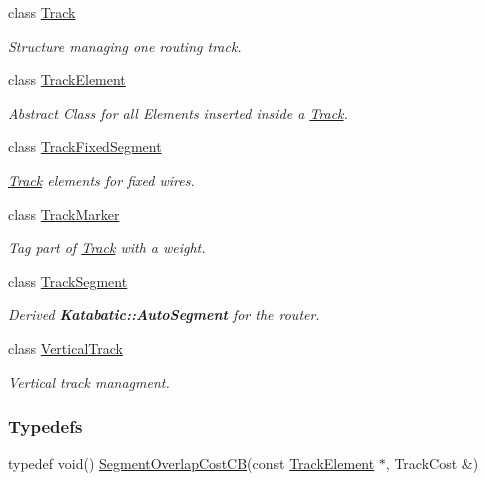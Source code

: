 \begin{DoxyCompactItemize}
class \hyperlink{classKite_1_1Track}{Track}
\begin{DoxyCompactList}\small\item\em Structure managing one routing track. \end{DoxyCompactList}\item 
class \hyperlink{classKite_1_1TrackElement}{Track\+Element}
\begin{DoxyCompactList}\small\item\em Abstract Class for all Elements inserted inside a \hyperlink{classKite_1_1Track}{Track}. \end{DoxyCompactList}\item 
class \hyperlink{classKite_1_1TrackFixedSegment}{Track\+Fixed\+Segment}
\begin{DoxyCompactList}\small\item\em \hyperlink{classKite_1_1Track}{Track} elements for fixed wires. \end{DoxyCompactList}\item 
class \hyperlink{classKite_1_1TrackMarker}{Track\+Marker}
\begin{DoxyCompactList}\small\item\em Tag part of \hyperlink{classKite_1_1Track}{Track} with a weight. \end{DoxyCompactList}\item 
class \hyperlink{classKite_1_1TrackSegment}{Track\+Segment}
\begin{DoxyCompactList}\small\item\em Derived \textbf{ Katabatic\+::\+Auto\+Segment} for the router. \end{DoxyCompactList}\item 
class \hyperlink{classKite_1_1VerticalTrack}{Vertical\+Track}
\begin{DoxyCompactList}\small\item\em Vertical track managment. \end{DoxyCompactList}\end{DoxyCompactItemize}
\subsubsection*{Typedefs}
\begin{DoxyCompactItemize}
\item 
typedef void() \hyperlink{namespaceKite_ac86883c8d5a0f34ab9b4ec6eaaad6c9f}{Segment\+Overlap\+Cost\+CB}(const \hyperlink{classKite_1_1TrackElement}{Track\+Element} $\ast$, Track\+Cost \&)
\end{DoxyCompactItemize}
